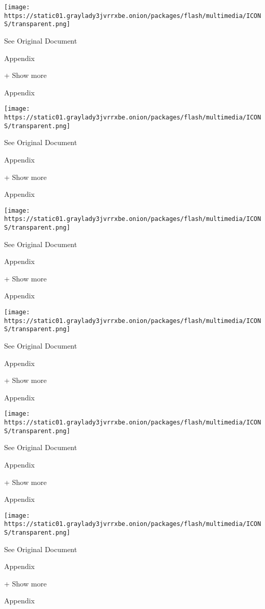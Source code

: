 \protect\hyperlink{}{}

\texttt{[image: https://static01.graylady3jvrrxbe.onion/packages/flash/multimedia/ICONS/transparent.png]}

See Original Document

Appendix

+ Show more

Appendix

\protect\hyperlink{}{}

\texttt{[image: https://static01.graylady3jvrrxbe.onion/packages/flash/multimedia/ICONS/transparent.png]}

See Original Document

Appendix

+ Show more

Appendix

\protect\hyperlink{}{}

\texttt{[image: https://static01.graylady3jvrrxbe.onion/packages/flash/multimedia/ICONS/transparent.png]}

See Original Document

Appendix

+ Show more

Appendix

\protect\hyperlink{}{}

\texttt{[image: https://static01.graylady3jvrrxbe.onion/packages/flash/multimedia/ICONS/transparent.png]}

See Original Document

Appendix

+ Show more

Appendix

\protect\hyperlink{}{}

\texttt{[image: https://static01.graylady3jvrrxbe.onion/packages/flash/multimedia/ICONS/transparent.png]}

See Original Document

Appendix

+ Show more

Appendix

\protect\hyperlink{}{}

\texttt{[image: https://static01.graylady3jvrrxbe.onion/packages/flash/multimedia/ICONS/transparent.png]}

See Original Document

Appendix

+ Show more

Appendix

\protect\hyperlink{}{}

